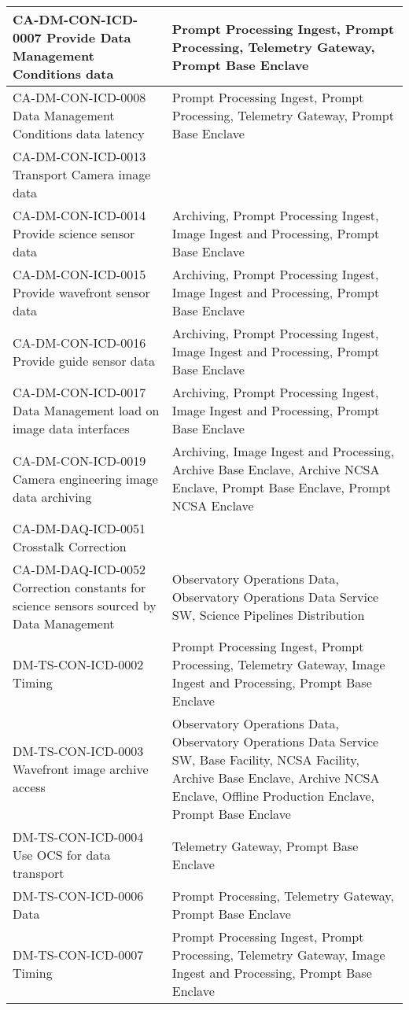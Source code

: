 \begin{longtable}{p{}p{}}
CA-DM-CON-ICD-0007 Provide Data Management Conditions data & Prompt Processing Ingest, Prompt Processing, Telemetry Gateway, Prompt Base Enclave \\ \hline
CA-DM-CON-ICD-0008 Data Management Conditions data latency & Prompt Processing Ingest, Prompt Processing, Telemetry Gateway, Prompt Base Enclave \\ \hline
CA-DM-CON-ICD-0013 Transport Camera image data &  \\ \hline
CA-DM-CON-ICD-0014 Provide science sensor data & Archiving, Prompt Processing Ingest, Image Ingest and Processing, Prompt Base Enclave \\ \hline
CA-DM-CON-ICD-0015 Provide wavefront sensor data & Archiving, Prompt Processing Ingest, Image Ingest and Processing, Prompt Base Enclave \\ \hline
CA-DM-CON-ICD-0016 Provide guide sensor data & Archiving, Prompt Processing Ingest, Image Ingest and Processing, Prompt Base Enclave \\ \hline
CA-DM-CON-ICD-0017 Data Management load on image data interfaces & Archiving, Prompt Processing Ingest, Image Ingest and Processing, Prompt Base Enclave \\ \hline
CA-DM-CON-ICD-0019 Camera engineering image data archiving & Archiving, Image Ingest and Processing, Archive Base Enclave, Archive NCSA Enclave, Prompt Base Enclave, Prompt NCSA Enclave \\ \hline
CA-DM-DAQ-ICD-0051 Crosstalk Correction &  \\ \hline
CA-DM-DAQ-ICD-0052 Correction constants for science sensors sourced by Data Management & Observatory Operations Data, Observatory Operations Data Service SW, Science Pipelines Distribution \\ \hline
DM-TS-CON-ICD-0002 Timing & Prompt Processing Ingest, Prompt Processing, Telemetry Gateway, Image Ingest and Processing, Prompt Base Enclave \\ \hline
DM-TS-CON-ICD-0003 Wavefront image archive access & Observatory Operations Data, Observatory Operations Data Service SW, Base Facility, NCSA Facility, Archive Base Enclave, Archive NCSA Enclave, Offline Production Enclave, Prompt Base Enclave \\ \hline
DM-TS-CON-ICD-0004 Use OCS for data transport & Telemetry Gateway, Prompt Base Enclave \\ \hline
DM-TS-CON-ICD-0006 Data & Prompt Processing, Telemetry Gateway, Prompt Base Enclave \\ \hline
DM-TS-CON-ICD-0007 Timing & Prompt Processing Ingest, Prompt Processing, Telemetry Gateway, Image Ingest and Processing, Prompt Base Enclave \\ \hline

\end{longtable}
